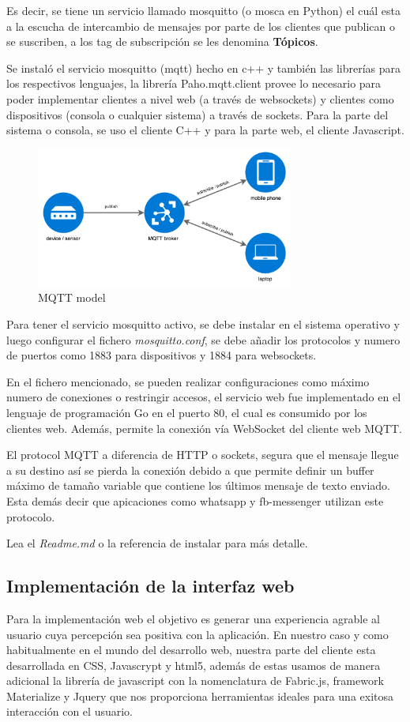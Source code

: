 \documentclass[a4paper]{article}
\begin{document}
Es decir, se tiene un servicio llamado mosquitto (o mosca en Python) el cuál esta a la escucha de intercambio de mensajes por parte de los clientes que publican o se suscriben, a los tag de subscripción se les denomina \textbf{Tópicos}.

Se instaló el servicio mosquitto (mqtt) hecho en c++ y también las librerías para los respectivos lenguajes, la librería Paho.mqtt.client \cite{paho} provee lo necesario para poder implementar clientes a nivel web (a través de websockets) y clientes como dispositivos (consola o cualquier sistema) a través de sockets. Para la parte del sistema o consola, se uso el cliente C++ y para la parte web, el cliente Javascript.

\begin{figure}[ht]
\centering
  \includegraphics[width=8.5cm]{images/broker.png}
  \caption{MQTT model}
  \label{fig2}
\end{figure}

Para tener el servicio mosquitto activo, se debe instalar en el sistema operativo y luego configurar el fichero \textit{mosquitto.conf}, se debe añadir los protocolos y numero de puertos como 1883 para dispositivos y 1884 para websockets.

En el fichero mencionado, se pueden realizar configuraciones como máximo numero de conexiones o restringir accesos, el servicio web fue implementado en el lenguaje de programación Go en el puerto 80, el cual es consumido por los clientes web. Además, permite la conexión vía WebSocket del cliente web MQTT.

El protocol MQTT a diferencia de HTTP o sockets, segura que el mensaje llegue a su destino así se pierda la conexión debido a que permite definir un buffer máximo de tamaño variable que contiene los últimos mensaje de texto enviado. Esta demás decir que apicaciones como whatsapp y fb-messenger utilizan este protocolo.

Lea el \textit{Readme.md} o la referencia de instalar \cite{jenazads} para más detalle.

\subsection{Implementación de la interfaz web} %
Para la implementación web el objetivo es generar una experiencia agrable al usuario cuya percepción sea positiva con la aplicación. En nuestro caso y como habitualmente en el mundo del desarrollo web, nuestra parte del cliente esta desarrollada en CSS, Javascrypt y html5, además de estas usamos de manera adicional la librería de javascript con la nomenclatura de Fabric.js, framework Materialize y Jquery que nos proporciona herramientas ideales para una exitosa interacción con el usuario.
\end{document}

